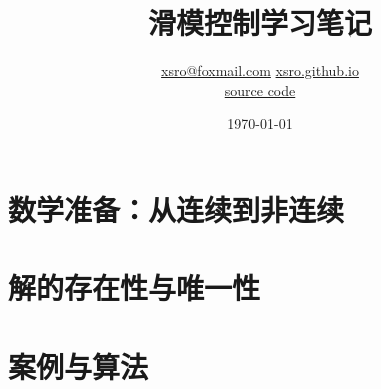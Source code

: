 \documentclass[UTF8]{ctexbook}
\title{滑模控制学习笔记}
\author{
	\href{mailto:xsro@foxmail.com}{xsro@foxmail.com} \href{https://xsro.github.io/about/}{xsro.github.io}\\
	\href{https://github.com/xsro/control-notes/tree/main/latex.control.sliding-mode}{source code}\\
}
\date{\today}
\theoremstyle{plain}
\theoremstyle{definition}
\theoremstyle{remark}
\begin{document}
	

	\maketitle
	\tableofcontents

	\part{数学准备：从连续到非连续}
	

	\part{解的存在性与唯一性}
	
	

	\part{案例与算法}
	

	
	
	\printbibliography[heading=bibintoc,title={参考文献}] %
\end{document}
